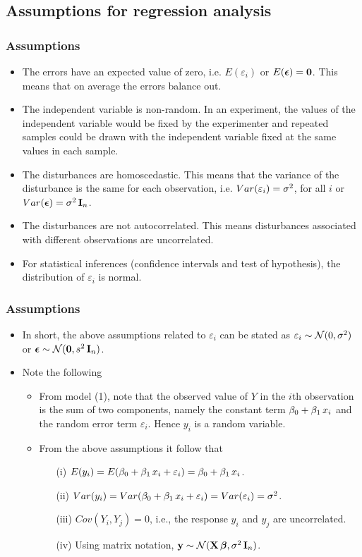 \documentclass{beamer}
\begin{document}
\subsection{Assumptions for regression analysis}
\begin{frame}\frametitle{Assumptions}
\begin{itemize}
\item The errors have an expected value of zero, i.e. $E(\varepsilon_i)$ or $E(\mbox{\boldmath $\epsilon$}) = {\bf 0}$. This means that on average the errors balance out.
\item The independent variable is non-random. In an experiment, the values of the independent variable would be fixed by the experimenter and repeated samples could be drawn with the independent variable fixed at the same values in each sample.
\item  The disturbances are homoscedastic. This means that the variance of the disturbance is the same for each observation, i.e. $Var(\varepsilon_i) = \sigma^2$, for all $i$ or $Var(\mbox{\boldmath $\epsilon$}) = \sigma^2\,{\bf I}_n$.
\item The disturbances are not autocorrelated. This means disturbances associated with different observations are uncorrelated.
\item For statistical inferences (confidence intervals and test of hypothesis), the distribution of $\varepsilon_i$ is normal.
\end{itemize}
\end{frame}

\begin{frame}\frametitle{Assumptions}
\begin{itemize}
\item In short, the above assumptions related to $\varepsilon_i$ can be stated as $\varepsilon_i \sim \mathcal N(0, \sigma^2)$ or $\mbox{\boldmath $\epsilon$} \sim \mathcal N({\bf 0}, s^2\,{\bf I}_n)$.
\item Note the following
   \begin{itemize}
      \item From model (1), note that the observed value of $Y$ in the $i$th observation is the sum of two components, namely the constant term $\beta_0 + \beta_1\,x_i$ and the random error term $\varepsilon_i$. Hence $y_i$ is a random variable.
      \item From the above assumptions it follow that
        \begin{itemize}
        \item[(i)] $E(y_i) = E(\beta_0 + \beta_1\,x_i + \varepsilon_i) = \beta_0 + \beta_1\,x_i$.
        \item[(ii)] $Var(y_i) = Var(\beta_0 + \beta_1\,x_i + \varepsilon_i)=Var(\varepsilon_i) = \sigma^2$.
        \item[(iii)] $Cov(Y_i,Y_j) = 0$, i.e., the response $y_i$ and $y_j$ are uncorrelated.
        \item[(iv)] Using matrix notation, ${\bf y} \sim \mathcal N({\bf X}\,\mbox{\boldmath $\beta$}, \sigma^2\,{\bf I}_n)$.
        \end{itemize}
    \end{itemize}
\end{itemize}
\end{frame}
\end{document}

